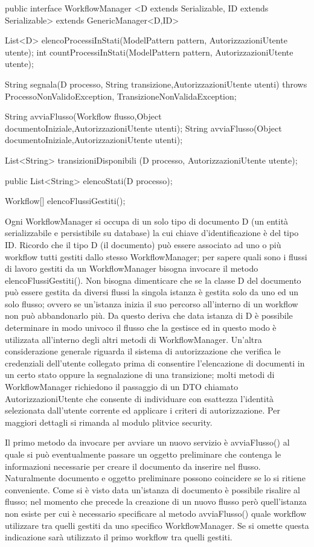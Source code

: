 \begin{java}
public interface WorkflowManager
<D extends Serializable, ID extends Serializable> 
extends GenericManager<D,ID> {

  List<D> elencoProcessiInStati(ModelPattern pattern, AutorizzazioniUtente utente);
  int countProcessiInStati(ModelPattern pattern, AutorizzazioniUtente utente);
  
  String segnala(D processo, String transizione,AutorizzazioniUtente utenti) throws ProcessoNonValidoException, TransizioneNonValidaException;
  
  String avviaFlusso(Workflow flusso,Object documentoIniziale,AutorizzazioniUtente utenti);
  String avviaFlusso(Object documentoIniziale,AutorizzazioniUtente utenti);

  List<String> transizioniDisponibili (D processo, AutorizzazioniUtente utente);

  public List<String> elencoStati(D processo);


  Workflow[] elencoFlussiGestiti();

}
\end{java}


Ogni WorkflowManager si occupa di un solo tipo di documento D (un entità serializzabile e persistibile su database) la cui chiave d'identificazione è del tipo ID. Ricordo che il tipo D (il documento) può essere associato ad uno o più workflow tutti gestiti dallo stesso WorkflowManager; per sapere quali sono i flussi di lavoro gestiti da un WorkflowManager bisogna invocare il metodo   elencoFlussiGestiti(). Non bisogna dimenticare che se la classe D del documento può essere gestita da diversi flussi la singola istanza è gestita solo da uno ed un solo flusso; ovvero se un'istanza inizia il suo percorso all'interno di un workflow non può abbandonarlo più. Da questo deriva che data istanza di D è possibile determinare in modo univoco il flusso che la gestisce ed in questo modo è utilizzata all'interno degli altri metodi di WorkflowManager. 
Un'altra considerazione generale riguarda il sistema di autorizzazione che verifica le credenziali dell'utente collegato prima di consentire l'elencazione di documenti in un certo stato oppure la segnalazione di una transizione; molti metodi di WorkflowManager richiedono il passaggio di un DTO chiamato AutorizzazioniUtente che consente di individuare con esattezza l'identità selezionata dall'utente corrente ed applicare i criteri di autorizzazione. Per maggiori dettagli si rimanda al modulo plitvice security.

Il primo metodo da invocare per avviare un nuovo servizio è avviaFlusso() al quale si può eventualmente passare un oggetto preliminare che contenga le informazioni necessarie per creare il documento da inserire nel flusso. Naturalmente documento e oggetto preliminare possono coincidere se lo si ritiene conveniente. Come si è visto data un'istanza di documento  è possibile risalire al flusso; nel momento che precede la creazione di un nuovo flusso però quell'istanza non esiste per cui è necessario specificare al  metodo avviaFlusso() quale workflow utilizzare tra quelli gestiti da uno specifico WorkflowManager. Se si omette questa indicazione sarà utilizzato il primo workflow tra quelli gestiti.


